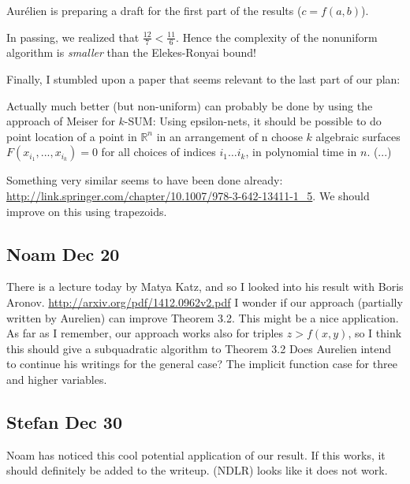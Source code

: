 Aurélien is preparing a draft for the first part of the results
($c = f(a,b)$).

In passing, we realized that \(\frac{12}{7} < \frac{11}{6}\). Hence the
complexity of the nonuniform algorithm is \emph{smaller} than the Elekes-Ronyai
bound!

Finally, I stumbled upon a paper that seems relevant to the last part of
our plan:

\begin{displayquote}
Actually much better (but non-uniform) can probably be done by using
the approach of Meiser for $k$-SUM: Using epsilon-nets, it should be
possible to do point location of a point in $\mathbb{R}^n$ in an arrangement of n
choose $k$ algebraic surfaces $F(x_{i_1},...,x_{i_k})=0$ for all choices of
indices $i_1 \ldots i_k$, in polynomial time in $n$. (...)
\end{displayquote}

Something very similar seems to have been done already:
\url{http://link.springer.com/chapter/10.1007/978-3-642-13411-1\_5}.
We should improve on this using trapezoids.

\subsection{Noam Dec 20}

There is a lecture today by Matya Katz, and so I looked into his
result with Boris Aronov. \url{http://arxiv.org/pdf/1412.0962v2.pdf}
I wonder if our approach (partially written by Aurelien) can improve
Theorem 3.2. This might be a nice application. As far as I remember,
our approach works also for triples $z>f(x,y)$, so I think this should
give a subquadratic algorithm to Theorem 3.2
Does Aurelien intend to continue his writings for the general case?
The implicit function case for three and higher variables.

\subsection{Stefan Dec 30}

Noam has noticed this cool potential application of our result. If
this works, it should definitely be added to the writeup.
(NDLR) looks like it does not work.
